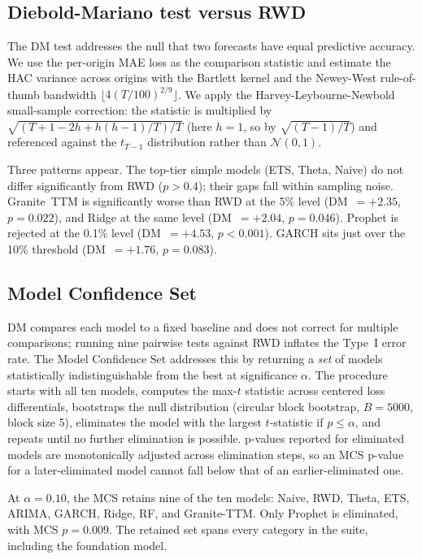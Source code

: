\documentclass[conference]{IEEEtran}
\begin{document}
\subsection{Diebold-Mariano test versus RWD}

The DM test \cite{diebold1995comparing} addresses the null that two
forecasts have equal predictive accuracy. We use the per-origin MAE
loss as the comparison statistic and estimate the HAC variance
across origins with the Bartlett kernel and the Newey-West
\cite{newey1994automatic} rule-of-thumb bandwidth
$\lfloor 4(T/100)^{2/9}\rfloor$. We apply the Harvey-Leybourne-Newbold
\cite{harvey1997testing} small-sample correction: the statistic is
multiplied by $\sqrt{(T+1-2h+h(h-1)/T)/T}$ (here $h=1$, so by
$\sqrt{(T-1)/T}$) and referenced against the $t_{T-1}$ distribution
rather than $\mathcal{N}(0,1)$.

Three patterns appear. The top-tier simple models (ETS, Theta, Naive)
do not differ significantly from RWD ($p > 0.4$); their gaps fall
within sampling noise. Granite~TTM is significantly worse than RWD
at the 5\% level (DM~$=+2.35$, $p = 0.022$), and Ridge at the same
level (DM~$=+2.04$, $p = 0.046$). Prophet is rejected at the 0.1\%
level (DM~$=+4.53$, $p < 0.001$). GARCH sits just over the 10\%
threshold (DM~$=+1.76$, $p = 0.083$).

\subsection{Model Confidence Set}

DM compares each model to a fixed baseline and does not correct for
multiple comparisons; running nine pairwise tests against RWD inflates
the Type~I error rate. The Model Confidence Set \cite{hansen2011model}
addresses this by returning a \emph{set} of models statistically
indistinguishable from the best at significance $\alpha$. The
procedure starts with all ten models, computes the max-$t$ statistic
across centered loss differentials, bootstraps the null distribution
(circular block bootstrap, $B = 5000$, block size 5), eliminates the
model with the largest $t$-statistic if $p \le \alpha$, and repeats
until no further elimination is possible. p-values reported for
eliminated models are monotonically adjusted across elimination
steps, so an MCS p-value for a later-eliminated model cannot fall
below that of an earlier-eliminated one.

At $\alpha = 0.10$, the MCS retains nine of the ten models: Naive,
RWD, Theta, ETS, ARIMA, GARCH, Ridge, RF, and Granite-TTM. Only
Prophet is eliminated, with MCS $p = 0.009$. The retained set spans
every category in the suite, including the foundation model.
\end{document}
